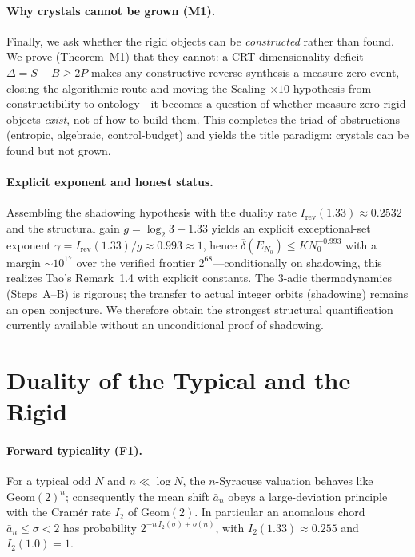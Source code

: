 \documentclass[12pt,a4paper]{article}
\begin{document}
\paragraph{Why crystals cannot be grown (M1).}
Finally, we ask whether the rigid objects can be \emph{constructed} rather than
found. We prove (Theorem~M1) that they cannot: a CRT dimensionality deficit
$\Delta=S-B\ge2P$ makes any constructive reverse synthesis a measure-zero
event, closing the algorithmic route and moving the Scaling $\times10$
hypothesis from constructibility to ontology---it becomes a question of whether
measure-zero rigid objects \emph{exist}, not of how to build them. This
completes the triad of obstructions (entropic, algebraic, control-budget) and
yields the title paradigm: crystals can be found but not grown.

\paragraph{Explicit exponent and honest status.}
Assembling the shadowing hypothesis with the duality rate
$I_{\mathrm{rev}}(1.33)\approx0.2532$ and the structural gain
$g=\log_2 3-1.33$ yields an explicit exceptional-set exponent
$\gamma=I_{\mathrm{rev}}(1.33)/g\approx0.993\approx1$, hence
$\overline\delta(E_{N_0})\le K N_0^{-0.993}$ with a margin $\sim10^{17}$ over the
verified frontier $2^{68}$---conditionally on shadowing, this realizes Tao's
Remark~1.4 with explicit constants. The $3$-adic thermodynamics (Steps~A--B) is
rigorous; the transfer to actual integer orbits (shadowing) remains an open
conjecture. We therefore obtain the strongest structural quantification
currently available without an unconditional proof of shadowing.

\section{Duality of the Typical and the Rigid}

\paragraph{Forward typicality (F1).} For a typical odd $N$ and $n\ll\log N$,
the $n$-Syracuse valuation behaves like $\mathrm{Geom}(2)^n$; consequently the
mean shift $\bar a_n$ obeys a large-deviation principle with the Cram\'er rate
$I_2$ of $\mathrm{Geom}(2)$. In particular an anomalous chord
$\bar a_n\le\sigma<2$ has probability $2^{-n\,I_2(\sigma)+o(n)}$, with
$I_2(1.33)\approx0.255$ and $I_2(1.0)=1$.
\end{document}
